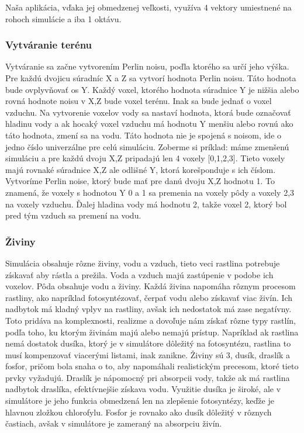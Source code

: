 \documentclass[12pt]{article}
\begin{document}
Naša aplikácia, vďaka jej obmedzenej veľkosti, využíva 4 vektory umiestnené
na rohoch simulácie a iba 1 oktávu.

\subsubsection{Vytváranie terénu}

Vytváranie sa začne vytvorením Perlin noisu, poďla ktorého sa určí jeho výška.
Pre každú dvojicu súradníc X a Z sa vytvorí hodnota Perlin noisu. Táto hodnota
bude ovplyvňovať os Y. Každý voxel, ktorého hodnota súradnice Y je nižšia alebo
rovná hodnote noisu v X,Z bude voxel terénu. Inak sa bude jednať o voxel
vzduchu. Na vytvorenie voxelov vody sa nastaví hodnota, ktorá bude označovať
hladinu vody a ak hocaký voxel vzduchu má hodnotu Y menšiu alebo rovnú ako táto
hodnota, zmení sa na vodu. Táto hodnota nie je spojená s noisom, ide o jedno
číslo univerzálne pre celú simuláciu. Zoberme si príklad: máme zmenšenú
simuláciu a pre každú dvoju X,Z pripadajú len 4 voxely [0,1,2,3]. Tieto voxely
majú rovnaké súradnice X,Z ale odlišné Y, ktorá korešponduje s ich číslom.
Vytvoríme Perlin noise, ktorý bude mať pre danú dvoju X,Z hodnotu 1. To
znamená, že voxely s hodnotou Y 0 a 1 sa premenia na voxely pôdy a voxely 2,3
na voxely vzduchu. Ďalej hladina vody má hodnotu 2, takže voxel 2, ktorý bol
pred tým vzduch sa premení na vodu.

\subsubsection{Živiny}

Simulácia obsahuje rôzne živiny, vodu a vzduch, tieto veci rastlina potrebuje
získavať aby rástla a prežila. Voda a vzduch majú zastúpenie v podobe ich
voxelov. Pôda obsahuje vodu a živiny. Každá živina napomáha rôznym procesom
rastliny, ako napríklad fotosyntézovať, čerpať vodu alebo získavať viac živín.
Ich nadbytok má kladný vplyv na rastliny, avšak ich nedostatok má zase
negatívny. Toto pridáva na komplexnosti, realizme a dovoľuje nám získať rôzne
typy rastlín, podľa toho, ku ktorým živinám majú alebo nemajú prístup.
Napríklad ak rastlina nemá dostatok dusíka, ktorý je v simulátore dôležitý
na fotosyntézu, rastlina to musí kompenzovať viacerými listami, inak zanikne.
Živiny sú 3, dusík, draslík a fosfor, pričom bola snaha o to, aby napomáhali
realistickým precesom, ktoré tieto prvky vyžadujú. Draslík je nápomocný pri
absorpcii vody, takže ak má rastlina nadbytok draslíka, efektívnejšie získava
vodu. Využitie dusíka je široké, ale v simulátore je jeho funkcia obmedzená
len na zlepšenie fotosyntézy, keďže je hlavnou zložkou chlorofylu. Fosfor je
rovnako ako dusík dôležitý v rôznych častiach, avšak v simulátore je zameraný
na absorpciu živín.
\end{document}

